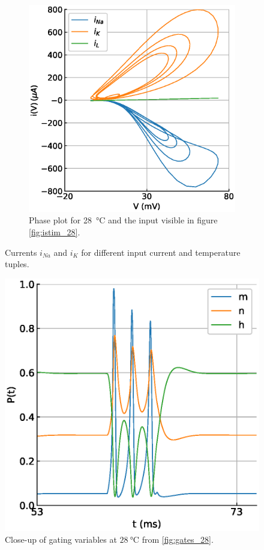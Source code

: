 \documentclass{scrartcl}			%
\begin{document}
\begin{figure}[H]
\begin{subfigure}[b]{0.5\linewidth}
    \includegraphics[width=\linewidth]{imgs/current_phases_at_28.eps} 
    \caption{Phase plot for \SI{28}{\celsius} and the input visible in figure \ref{fig:istim_28}.} 
    \label{fig:phases_28} 
    \end{subfigure} 
  \caption{Currents $i_{Na}$ and $i_{K}$ for different input current and temperature tuples.}
  \label{fig:phases} 
\end{figure}

\begin{figure}[H]
    \centering
    \includegraphics[width=.5\linewidth]{imgs/gates_at_28_from5300.eps} 
    \caption{Close-up of gating variables at $\SI{28}{\celsius}$ from  \ref{fig:gates_28}.} 
    \label{fig:decreasing_peak_explanation} 
\end{figure}
\end{document}
